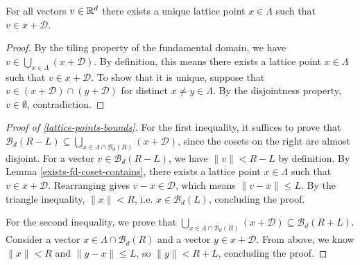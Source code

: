 \begin{lemma}\label{exists-fd-coset-contains}\lean{}
  For all vectors $v \in \mathbb{R}^d$ there exists a unique lattice point $x \in \Lambda$ such that $v \in x + \mathcal{D}$.
\end{lemma}
\begin{proof}
  By the tiling property of the fundamental domain, we have $v \in \bigcup_{x \in \Lambda} (x + \mathcal{D})$. By definition, this means there exists a lattice point $x \in \Lambda$ such that $v \in x + \mathcal{D}$. To show that it is unique, suppose that $v \in (x + \mathcal{D}) \cap (y + \mathcal{D})$ for distinct $x \neq y \in \Lambda$. By the disjointness property, $v \in \emptyset$, contradiction.
\end{proof}

\begin{proof}[Proof of \cref{lattice-points-bounds}]\label{lattice-points-bounds-proof}
  For the first inequality, it suffices to prove that $\mathcal{B}_d(R - L) \subseteq \bigcup_{x \in \Lambda \cap \mathcal{B}_d(R)} (x + \mathcal{D})$, since the cosets on the right are almost disjoint. For a vector $v \in \mathcal{B}_d(R - L)$, we have $\|v\| < R - L$ by definition. By Lemma \cref{exists-fd-coset-contains}, there exists a lattice point $x \in \Lambda$ such that $v \in x + \mathcal{D}$. Rearranging gives $v - x \in \mathcal{D}$, which means $\|v - x\| \leq L$. By the triangle inequality, $\|x\| < R$, i.e. $x \in \mathcal{B}_d(L)$, concluding the proof.

  For the second inequality, we prove that $\bigcup_{x \in \Lambda \cap \mathcal{B}_d(R)} (x + \mathcal{D}) \subseteq \mathcal{B}_d(R + L)$. Consider a vector $x \in \Lambda \cap \mathcal{B}_d(R)$ and a vector $y \in x + \mathcal{D}$. From above, we know $\|x\| < R$ and $\|y - x\| \leq L$, so $\|y\| < R + L$, concluding the proof.
\end{proof}
